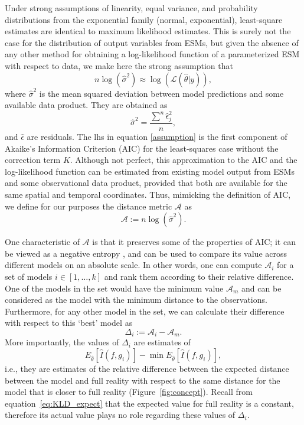 \documentclass[gmd, manuscript]{copernicus}
\begin{document}
Under strong assumptions of linearity, equal variance, and probability distributions from the exponential family (normal, exponential), least-square estimates are identical to maximum likelihood estimates. This is surely not the case for the distribution of output variables from ESMs, but given the absence of any other method for obtaining a log-likelihood function of a parameterized ESM with respect to data, we make here the strong assumption that
\begin{equation} \label{assumption}
n \log(\hat{\sigma}^2) \approx \log (\mathcal{L}(\hat{\theta} | y) ),
\end{equation}
where $\hat{\sigma}^2$ is the mean squared deviation between model predictions and some available data product. They are obtained as
\begin{equation}
\hat{\sigma}^2 = \frac{\sum^n \hat{\epsilon}_j^2 }{n},
\end{equation}
and $\hat{\epsilon}$ are residuals. The lhs in equation \eqref{assumption} is the first component of Akaike's Information Criterion (AIC) for the least-squares case without the correction term $K$. Although not perfect, this approximation to the AIC and the log-likelihood function can be estimated from existing model output from ESMs and some observational data product, provided that both are available for the same spatial and temporal coordinates. Thus, mimicking the definition of AIC, we define for our purposes the distance metric $\mathcal{A}$ as
\begin{equation} \label{eq:A}
\mathcal{A} := n \log (\hat{\sigma}^2).
\end{equation} 

One characteristic of $\mathcal{A}$ is that it preserves some of the properties of AIC; it can be viewed as a negative entropy \citep{Akaike1985}, and can be used to compare its value across different models on an absolute scale. In other words, one can compute $\mathcal{A}_i$ for a set of models $i \in [1, \dots ,k]$ and rank them according to their relative difference. One of the models in the set would have the minimum value $\mathcal{A}_m$ and can be considered as the model with the minimum distance to the observations. Furthermore, for any other model in the set, we can calculate their difference with respect to this `best' model as
\begin{equation} \label{eq:Deltai}
\Delta_i := \mathcal{A}_i - \mathcal{A}_m.
\end{equation}
More importantly, the values of $\Delta_i$ are estimates of 
\begin{equation}
E_{\hat{\theta}} [\hat{I}(f, g_i)] - \min E_{\hat{\theta}} [\hat{I}(f, g_i)],
\end{equation}
i.e., they are estimates of the relative difference between the expected distance between the model and full reality with respect to the same distance for the model that is closer to full reality (Figure~\ref{fig:concept}). Recall from equation~\ref{eq:KLD_expect} that the expected value for full reality is a constant, therefore its actual value plays no role regarding these values of $\Delta_i$.
\end{document}
